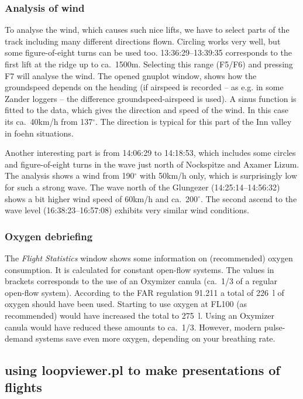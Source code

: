 \subsubsection{Analysis of wind}
To analyse the wind, which causes such nice lifts, we have to select parts of the track including many different directions flown. Circling works very well, but some figure-of-eight turns can be used too.
13:36:29--13:39:35 corresponds to the first lift at the ridge up to ca.~1500m. Selecting this range (F5/F6) and pressing F7 will analyse the wind. The opened gnuplot window, shows how the groundspeed depends on the heading (if airspeed is recorded -- as e.g. in some Zander loggers -- the difference groundspeed-airspeed is used). A sinus function is fitted to the data, which gives the direction and speed of the wind. In this case its ca.~40km/h from 137$^\circ$. The direction is typical for this part of the Inn valley in foehn situations.

Another interesting part is from 14:06:29 to 14:18:53, which includes some circles and figure-of-eight turns in the wave just north of Nockspitze and Axamer Lizum. The analysis shows a wind from 190$^\circ$ with 50km/h only, which is surprisingly low for such a strong wave.
The wave north of the Glungezer (14:25:14--14:56:32) shows a bit higher wind speed of 60km/h and ca.~200$^\circ$.
The second ascend to the wave level (16:38:23--16:57:08) exhibits very similar wind conditions.

\subsubsection{Oxygen debriefing}
The \emph{Flight Statistics} window shows some information on (recommended) oxygen consumption. It is calculated for constant open-flow systems. The values in brackets corresponds to the use of an Oxymizer canula (ca.~1/3 of a regular open-flow system).
According to the FAR regulation 91.211 a total of 226~l of oxygen should have been used. Starting to use oxygen at FL100 (as recommended) would have increased the total to 275~l. Using an Oxymizer canula would have reduced these amounts to ca.~1/3.
However, modern pulse-demand systems save even more oxygen, depending on your breathing rate.


\clearpage

\subsection{using loopviewer.pl to make presentations of flights}

